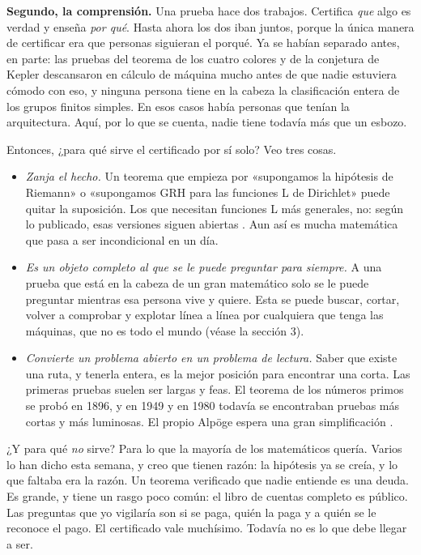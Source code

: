\documentclass[11pt,a4paper]{article}
\begin{document}
\textbf{Segundo, la comprensión.} Una prueba hace dos trabajos. Certifica \emph{que} algo es verdad y enseña \emph{por qué}. Hasta ahora los dos iban juntos, porque la única manera de certificar era que personas siguieran el porqué. Ya se habían separado antes, en parte: las pruebas del teorema de los cuatro colores y de la conjetura de Kepler descansaron en cálculo de máquina mucho antes de que nadie estuviera cómodo con eso, y ninguna persona tiene en la cabeza la clasificación entera de los grupos finitos simples. En esos casos había personas que tenían la arquitectura. Aquí, por lo que se cuenta, nadie tiene todavía más que un esbozo.

Entonces, ¿para qué sirve el certificado por sí solo? Veo tres cosas.

\begin{itemize}
\item \emph{Zanja el hecho.} Un teorema que empieza por «supongamos la hipótesis de Riemann» o «supongamos GRH para las funciones L de Dirichlet» puede quitar la suposición. Los que necesitan funciones L más generales, no: según lo publicado, esas versiones siguen abiertas \cite{s2}. Aun así es mucha matemática que pasa a ser incondicional en un día.
\item \emph{Es un objeto completo al que se le puede preguntar para siempre.} A una prueba que está en la cabeza de un gran matemático solo se le puede preguntar mientras esa persona vive y quiere. Esta se puede buscar, cortar, volver a comprobar y explotar línea a línea por cualquiera que tenga las máquinas, que no es todo el mundo (véase la sección 3).
\item \emph{Convierte un problema abierto en un problema de lectura.} Saber que existe una ruta, y tenerla entera, es la mejor posición para encontrar una corta. Las primeras pruebas suelen ser largas y feas. El teorema de los números primos se probó en 1896, y en 1949 y en 1980 todavía se encontraban pruebas más cortas y más luminosas. El propio Alpöge espera una gran simplificación \cite{s3}.
\end{itemize}

¿Y para qué \emph{no} sirve? Para lo que la mayoría de los matemáticos quería. Varios lo han dicho esta semana, y creo que tienen razón: la hipótesis ya se creía, y lo que faltaba era la razón. Un teorema verificado que nadie entiende es una deuda. Es grande, y tiene un rasgo poco común: el libro de cuentas completo es público. Las preguntas que yo vigilaría son si se paga, quién la paga y a quién se le reconoce el pago. El certificado vale muchísimo. Todavía no es lo que debe llegar a ser.
\end{document}
